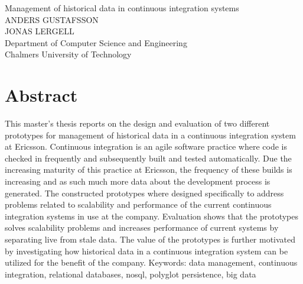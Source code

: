 Management of historical data in continuous integration systems\\
ANDERS GUSTAFSSON\\
JONAS LERGELL\\
Department of Computer Science and Engineering\\
Chalmers University of Technology\\

\thispagestyle{plain}			%
\section*{Abstract}
This master's thesis reports on the design and evaluation of two different prototypes for management of historical data in a continuous integration system at Ericsson. Continuous integration is an agile software practice where code is checked in frequently and subsequently built and tested automatically. Due the increasing maturity of this practice at Ericsson, the frequency of these builds is increasing and as such much more data about the development process is generated. The constructed prototypes where designed specifically to address problems related to scalability and performance of the current continuous integration systems in use at the company. Evaluation shows that the prototypes solves scalability problems and increases performance of current systems by separating live from stale data. The value of the prototypes is further motivated by investigating how historical data in a continuous integration system can be utilized for the benefit of the company.
\vfill
Keywords: data management, continuous integration, relational databases, nosql, polyglot persistence, big data

\newpage				%
\thispagestyle{empty}
\mbox{}